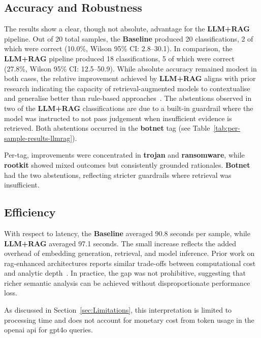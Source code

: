 \subsection{Accuracy and Robustness}
The results show a clear, though not absolute, advantage for the \textbf{LLM+RAG} pipeline. Out of
20 total samples, the \textbf{Baseline} produced 20 classifications, 2 of which were correct
(10.0\%, Wilson 95\% CI: 2.8--30.1). In comparison, the \textbf{LLM+RAG} pipeline produced 18
classifications, 5 of which were correct (27.8\%, Wilson 95\% CI: 12.5--50.9). While absolute
accuracy remained modest in both cases, the relative improvement achieved by \textbf{LLM+RAG}
aligns with prior research indicating the capacity of retrieval-augmented models to contextualise
and generalise better than rule-based approaches~\cite{fujii2024llm, gao2023retrieval}. The
abstentions observed in two of the \textbf{LLM+RAG} classifications are due to a built-in guardrail
where the model was instructed to not pass judgement when insufficient evidence is retrieved. Both
abstentions occurred in the \textbf{botnet} tag (see Table~\ref{tab:per-sample-results-llmrag}).

Per-tag, improvements were concentrated in \textbf{trojan} and \textbf{ransomware}, while
\textbf{rootkit} showed mixed outcomes but consistently grounded rationales. \textbf{Botnet} had
the two abstentions, reflecting stricter guardrails where retrieval was insufficient.

\subsection{Efficiency}
With respect to latency, the \textbf{Baseline} averaged 90.8 seconds per sample, while
\textbf{LLM+RAG} averaged 97.1 seconds. The small increase reflects the added overhead of embedding
generation, retrieval, and model inference. Prior work on \gls{rag}-enhanced architectures reports
similar trade-offs between computational cost and analytic depth~\cite{gao2023retrieval,
      lewis2020retrieval}. In practice, the gap was not prohibitive, suggesting that richer semantic
analysis can be achieved without disproportionate performance loss.

As discussed in Section~\ref{sec:Limitations}, this interpretation is limited to processing time
and does not account for monetary cost from token usage in the \gls{openai} \gls{api} for
\gls{gpt4o} queries.

